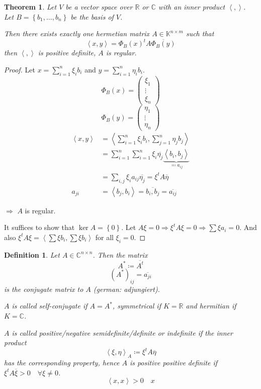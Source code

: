 \documentclass[a4paper,landscape,twocolumn]{article}
\newcommand\set[1]{\left\{#1\right\}}
\newcommand\functional[1]{\left\langle{#1}\right\rangle}
\newtheorem{theorem}{Theorem}
\newtheorem{defi}{Definition}
\DeclareMathOperator\kernel{ker} %
\begin{document}
\begin{theorem}
  \label{theorem-8.21}
  Let $V$ be a vector space over $\mathbb R$ or $\mathbb C$ with an inner product $\functional{,}$.
  Let $B = \set{b_1, \ldots, b_n}$ be the basis of $V$.

  Then there exists exactly one hermetian matrix $A \in \mathbb K^{n\times m}$
  such that
  \[ \functional{x,y} = \Phi_B (x)^t A \overline{\Phi_B (y)} \]
  then $\functional{,}$ is positive definite, $A$ is regular.
\end{theorem}

\begin{proof}
  Let $x = \sum_{i=1}^n \xi_i b_i$ and $y = \sum_{i=1}^n \eta_i b_i$.
  \[ \Phi_B(x) = \begin{pmatrix} \xi_1 \\ \vdots \\ \xi_n \end{pmatrix} \]
  \[ \Phi_B(y) = \begin{pmatrix} \eta_1 \\ \vdots \\ \eta_n \end{pmatrix} \]
  \begin{align*}
    \functional{x,y}
      &= \functional{\sum_{i=1}^n \xi_i b_i, \sum_{j=1}^n \eta_j b_j} \\
      &= \sum_{i=1}^n \sum_{i=1}^n \xi_i \overline{\eta_j} \underbrace{\functional{b_i, b_j}}_{\eqqcolon a_{ij}} \\
      &= \sum_{i,j} \xi_i a_{ij} \overline{\eta_j} = \xi^t A \overline{\eta} \\
    a_{ji} &= \functional{b_j,b_i} = \overline{b_i,b_j} = \overline{a_{ij}}
  \end{align*}


   $\Rightarrow$ $A$ is regular.

   It suffices to show that $\kernel{A} = \set{0}$.
   Let $A \xi = 0 \Rightarrow \xi^t A \xi = 0 \Rightarrow \sum \xi a_i = 0$.
   And also $\xi^t A \xi = \functional{\sum \xi b_i, \sum \xi b_i}$ for all $\xi_i = 0$.
\end{proof}

\begin{defi}
  \label{def-8.22}
  Let $A \in \mathbb C^{n\times n}$.
  Then the matrix
  \[ A^* \coloneqq \overline{A^t} \]
  \[ \left(A^*\right)_{ij} = \overline{a_{ji}} \]
  is the conjugate matrix to $A$ (german: adjungiert).

  $A$ is called self-conjugate if $A = A^*$, symmetrical if $K = \mathbb R$ and hermitian if $K = \mathbb C$.

  $A$ is called positive/negative semidefinite/definite or indefinite if the inner product
  \[ \functional{\xi, \eta}_A \coloneqq \xi^t A \overline{\eta} \]
  has the corresponding property, hence $A$ is positive positive definite if $\xi^t A \overline{\xi} > 0 \quad \forall \xi \neq 0$.
  \[ \functional{x,x} > 0 \quad x \]
\end{defi}
\end{document}
